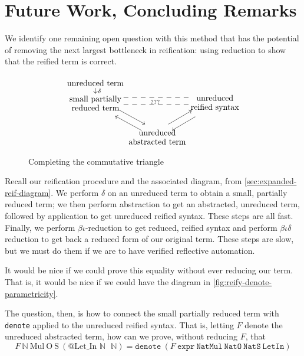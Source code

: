 \section{Future Work, Concluding Remarks} \label{sec:future}

We identify one remaining open question with this method that has the potential of removing the next largest bottleneck in reification: using reduction to show that the reified term is correct.

\begin{figure}
\vspace{-36pt}
\[
\xymatrix@R=0.5em@C=0em{
    \txt{unreduced term} \ar[d]^{\delta} \\
    \txt{small partially \\ reduced term}
    \ar@<1ex>[ddr]
    \ar@<-1ex>@{--}[rr]
    &&
    \txt{unreduced \\ reified syntax}
    \ar@<-1ex>@{--}[ll]^{???}
    \ar@<1ex>[ddl]
    \\ \\
    &
    \txt{unreduced \\ abstracted term}
    \ar@<1ex>[uul]
    \ar@<1ex>[uur]%
}
\]
\vspace{-18pt}
\caption{Completing the commutative triangle}\label{fig:reify-denote-parametricity}
\end{figure}
Recall our reification procedure and the associated diagram, from \autoref{sec:expanded-reif-diagram}.
We perform $\delta$ on an unreduced term to obtain a small, partially reduced term;
we then perform abstraction to get an abstracted, unreduced term, followed by application to get unreduced reified syntax.
These steps are all fast.
Finally, we perform $\beta\iota$-reduction to get reduced, reified syntax and perform $\beta\iota\delta$ reduction to get back a reduced form of our original term.
These steps are slow, but we must do them if we are to have verified reflective automation.

It would be nice if we could prove this equality without ever reducing our term.
That is, it would be nice if we could have the diagram in \autoref{fig:reify-denote-parametricity}.

The question, then, is how to connect the small partially reduced term with \texttt{denote} applied to the unreduced reified syntax.
That is, letting $F$ denote the unreduced abstracted term, how can we prove, without reducing $F$, that
\[
F\ \mathbb{N}\ \text{Mul}\ \text{O}\ \text{S}\ (\text{@Let\_In }\mathbb{N}\texttt{ }\mathbb{N})
=
\texttt{denote}\ \left(F\ \texttt{expr}\ \texttt{NatMul}\ \texttt{NatO}\ \texttt{NatS}\ \texttt{LetIn}\right)
\]

